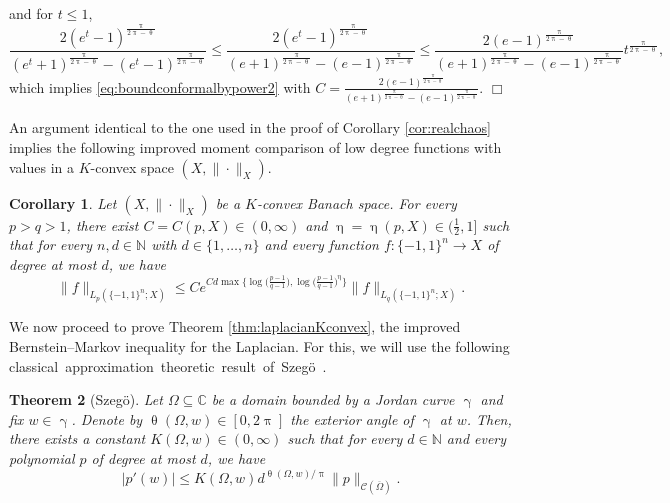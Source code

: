 \documentclass[11pt,reqno]{amsart}
\renewcommand{\leq}{\leqslant}
\renewcommand{\gamma}{\upgamma}
\renewcommand{\pi}{\uppi}
\newcommand{\1}{\mathbf 1}
\newtheorem{theorem}{Theorem}
\newtheorem{corollary}[theorem]{Corollary}
\theoremstyle{remark}
\newcommand{\C}{\mathbb C}
\newcommand{\N}{\mathbb N}
\renewcommand{\theta}{\uptheta}
\renewcommand{\gamma}{\upgamma}
\renewcommand{\pi}{\uppi}
\renewcommand{\eta}{\upeta}
\renewcommand{\pi}{\uppi}
\newcommand{\ms}{\mathscr}
\begin{document}
and for $t\leq1$,
\begin{equation}
\frac{2(e^t-1)^{\frac{\pi}{2\pi-\theta}}}{(e^t+1)^{\frac{\pi}{2\pi-\theta}}-(e^t-1)^{\frac{\pi}{2\pi-\theta}}} \leq \frac{2(e^t-1)^{\frac{\pi}{2\pi-\theta}}}{(e+1)^{\frac{\pi}{2\pi-\theta}}-(e-1)^{\frac{\pi}{2\pi-\theta}}} \leq \frac{2(e-1)^{\frac{\pi}{2\pi-\theta}}}{(e+1)^{\frac{\pi}{2\pi-\theta}}-(e-1)^{\frac{\pi}{2\pi-\theta}}} t^{\frac{\pi}{2\pi-\theta}},
\end{equation}
which implies \eqref{eq:boundconformalbypower2} with $C= \frac{2(e-1)^{\frac{\pi}{2\pi-\theta}}}{(e+1)^{\frac{\pi}{2\pi-\theta}}-(e-1)^{\frac{\pi}{2\pi-\theta}}}$.
\hfill$\Box$

\medskip

An argument identical to the one used in the proof of Corollary \ref{cor:realchaos} implies the following improved moment comparison of low degree functions with values in a $K$-convex space $(X,\|\cdot\|_X)$.

\begin{corollary} \label{cor:momentcompKconvex}
Let $(X,\|\cdot\|_X)$ be a $K$-convex Banach space. For every $p>q>1$, there exist $C=C(p,X)\in(0,\infty)$ and $\eta=\eta(p,X)\in\big(\frac{1}{2},1\big]$ such that for every $n,d\in\N$ with $d\in\{1,\ldots,n\}$ and every function $f:\{-1,1\}^n\to X$ of degree at most $d$, we have
\begin{equation}
\|f\|_{L_p(\{-1,1\}^n;X)} \leq Ce^{Cd\max\big\{ \log\big(\frac{p-1}{q-1}\big), \log \big(\frac{p-1}{q-1} \big)^\eta \big\}}\|f\|_{L_q(\{-1,1\}^n;X)}.
\end{equation}
\end{corollary}

We now proceed to prove Theorem \ref{thm:laplacianKconvex}, the improved Bernstein--Markov inequality for the Laplacian. For this, we will use the following \mbox{classical approximation theoretic result of Szeg\"o \cite{Sze25}.}

\begin{theorem} [Szeg\"o]
Let $\Omega \subseteq\C$ be a domain bounded by a Jordan curve $\gamma$ and fix $w\in\gamma$. Denote by $\theta(\Omega,w) \in [0,2\pi]$ the exterior angle of $\gamma$ at $w$. Then, there exists a constant $K(\Omega,w)\in(0,\infty)$ such that for every $d\in\N$ and every polynomial $p$ of degree at most $d$, we have
\begin{equation} \label{eq:szego}
|p'(w)| \leq K(\Omega,w) d^{\theta(\Omega,w)/\pi} \|p\|_{\ms{C}(\overline{\Omega})}.
\end{equation}
\end{theorem}
\end{document}
